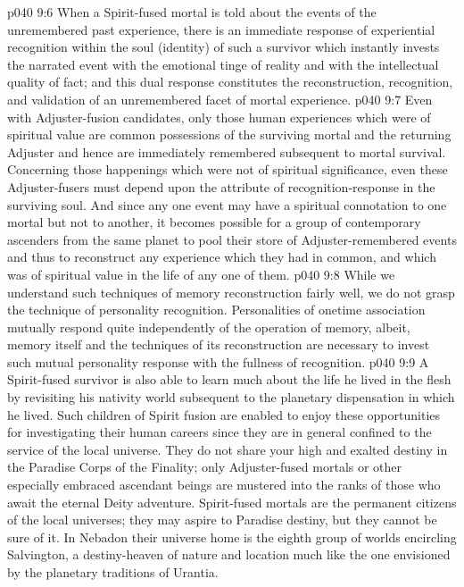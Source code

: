 \vs p040 9:6 When a Spirit\hyp{}fused mortal is told about the events of the unremembered past experience, there is an immediate response of experiential recognition within the soul (identity) of such a survivor which instantly invests the narrated event with the emotional tinge of reality and with the intellectual quality of fact; and this dual response constitutes the reconstruction, recognition, and validation of an unremembered facet of mortal experience.
\vs p040 9:7 Even with Adjuster\hyp{}fusion candidates, only those human experiences which were of spiritual value are common possessions of the surviving mortal and the returning Adjuster and hence are immediately remembered subsequent to mortal survival. Concerning those happenings which were not of spiritual significance, even these Adjuster\hyp{}fusers must depend upon the attribute of recognition\hyp{}response in the surviving soul. And since any one event may have a spiritual connotation to one mortal but not to another, it becomes possible for a group of contemporary ascenders from the same planet to pool their store of Adjuster\hyp{}remembered events and thus to reconstruct any experience which they had in common, and which was of spiritual value in the life of any one of them.
\vs p040 9:8 \pc While we understand such techniques of memory reconstruction fairly well, we do not grasp the technique of personality recognition. Personalities of onetime association mutually respond quite independently of the operation of memory, albeit, memory itself and the techniques of its reconstruction are necessary to invest such mutual personality response with the fullness of recognition.
\vs p040 9:9 \pc A Spirit\hyp{}fused survivor is also able to learn much about the life he lived in the flesh by revisiting his nativity world subsequent to the planetary dispensation in which he lived. Such children of Spirit fusion are enabled to enjoy these opportunities for investigating their human careers since they are in general confined to the service of the local universe. They do not share your high and exalted destiny in the Paradise Corps of the Finality; only Adjuster\hyp{}fused mortals or other especially embraced ascendant beings are mustered into the ranks of those who await the eternal Deity adventure. Spirit\hyp{}fused mortals are the permanent citizens of the local universes; they may aspire to Paradise destiny, but they cannot be sure of it. In Nebadon their universe home is the eighth group of worlds encircling Salvington, a destiny\hyp{}heaven of nature and location much like the one envisioned by the planetary traditions of Urantia.

